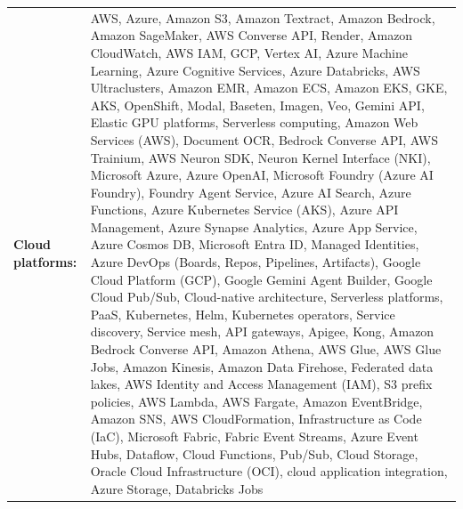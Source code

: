 \documentclass[letterpaper,11pt]{article}
\begin{document}
\begin{tabularx}{\linewidth}{@{}>{\raggedright\arraybackslash}p{1.8in}X@{}}
\textbf{Cloud platforms:} & \footnotesize{AWS, Azure, Amazon S3, Amazon Textract, Amazon Bedrock, Amazon SageMaker, AWS Converse API, Render, Amazon CloudWatch, AWS IAM, GCP, Vertex AI, Azure Machine Learning, Azure Cognitive Services, Azure Databricks, AWS Ultraclusters, Amazon EMR, Amazon ECS, Amazon EKS, GKE, AKS, OpenShift, Modal, Baseten, Imagen, Veo, Gemini API, Elastic GPU platforms, Serverless computing, Amazon Web Services (AWS), Document OCR, Bedrock Converse API, AWS Trainium, AWS Neuron SDK, Neuron Kernel Interface (NKI), Microsoft Azure, Azure OpenAI, Microsoft Foundry (Azure AI Foundry), Foundry Agent Service, Azure AI Search, Azure Functions, Azure Kubernetes Service (AKS), Azure API Management, Azure Synapse Analytics, Azure App Service, Azure Cosmos DB, Microsoft Entra ID, Managed Identities, Azure DevOps (Boards, Repos, Pipelines, Artifacts), Google Cloud Platform (GCP), Google Gemini Agent Builder, Google Cloud Pub/Sub, Cloud-native architecture, Serverless platforms, PaaS, Kubernetes, Helm, Kubernetes operators, Service discovery, Service mesh, API gateways, Apigee, Kong, Amazon Bedrock Converse API, Amazon Athena, AWS Glue, AWS Glue Jobs, Amazon Kinesis, Amazon Data Firehose, Federated data lakes, AWS Identity and Access Management (IAM), S3 prefix policies, AWS Lambda, AWS Fargate, Amazon EventBridge, Amazon SNS, AWS CloudFormation, Infrastructure as Code (IaC), Microsoft Fabric, Fabric Event Streams, Azure Event Hubs, Dataflow, Cloud Functions, Pub/Sub, Cloud Storage, Oracle Cloud Infrastructure (OCI), cloud application integration, Azure Storage, Databricks Jobs}\\
\end{tabularx}
\par\vspace{2pt}
\end{document}
